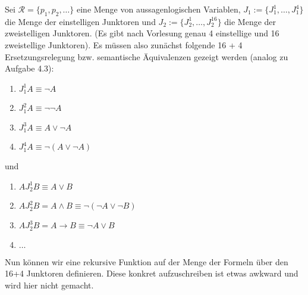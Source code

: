 \begin{lösung}
	Sei $\mathcal{R}=\lbrace p_1,p_2,\ldots\rbrace$ eine Menge von aussagenlogischen Variablen, 
	$J_1:=\lbrace J_1^1,\ldots,J_1^4\rbrace$ die Menge der einstelligen Junktoren und $J_2:=\lbrace J_2^1,\ldots,J_2^{16}\rbrace$ die Menge der zweistelligen Junktoren. 
	(Es gibt nach Vorlesung genau 4 einstellige und 16 zweistellige Junktoren). 
	Es müssen also zunächst folgende 16 + 4 Ersetzungsrelegung bzw. semantische Äquivalenzen gezeigt werden (analog zu Aufgabe 4.3):
	\begin{enumerate}
		\item $J_1^1 A\equiv\neg A$
		\item $J_1^2 A\equiv\neg\neg A$
		\item $J_1^3 A\equiv A\vee\neg A$
		\item $J_1^4 A\equiv\neg(A\vee\neg A)$
	\end{enumerate}
	und
	\begin{enumerate}
		\item $A J_2^1 B\equiv A\vee B$
		\item $A J_2^2 B=A\wedge B\equiv\neg(\neg A\vee\neg B)$
		\item $A J_2^3 B=A\to B\equiv\neg A\vee B$
		\item $\ldots$
	\end{enumerate}
	Nun können wir eine rekursive Funktion auf der Menge der Formeln über den 16+4 Junktoren definieren.
	Diese konkret aufzuschreiben ist etwas awkward und wird hier nicht gemacht.
\end{lösung}

